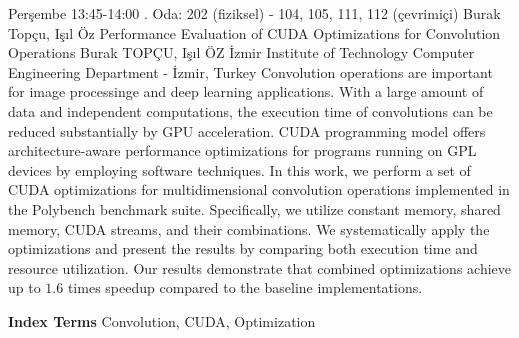 
    \begin{abstract_basarim}
    {Perşembe 13:45-14:00}
    {.}
    {Oda: 202 (fiziksel) - 104, 105, 111, 112 (çevrimiçi)}
    {Burak Topçu, Işıl Öz}
    {Performance Evaluation of CUDA Optimizations for Convolution Operations}
    {%
    Burak TOPÇU, Işıl ÖZ}
    {%
    }
    {%
    İzmir Institute of Technology Computer Engineering Department - İzmir, Turkey}
    Convolution operations are important for image processinge and deep learning applications. With a large amount of data and independent computations, the execution time of convolutions can be reduced substantially by GPU acceleration. CUDA programming model offers architecture-aware performance optimizations for programs running on GPL devices by employing software techniques. In this work, we perform a set of CUDA optimizations for multidimensional convolution operations implemented in the Polybench benchmark suite. Specifically, we utilize constant memory, shared memory, CUDA streams, and their combinations. We systematically apply the optimizations and present the results by comparing both execution time and resource utilization. Our results demonstrate that combined optimizations achieve up to $1.6$ times speedup compared to the baseline implementations. 
    
            \textbf{Index Terms} \newline{}Convolution, CUDA, Optimization
    \end{abstract_basarim}
    